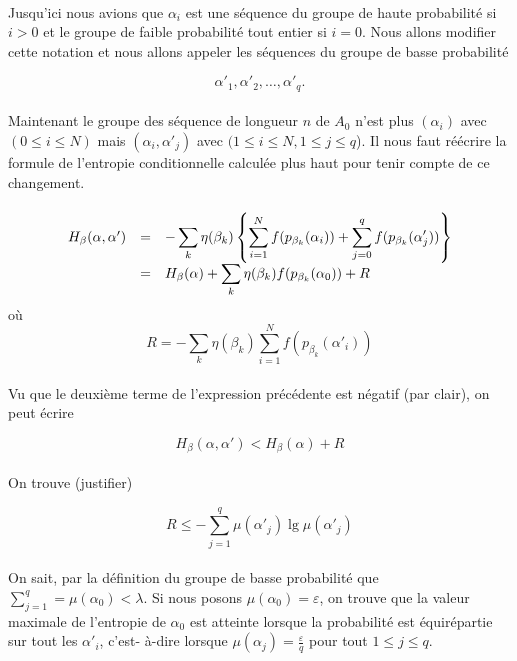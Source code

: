 	\paragraph{}
	Jusqu'ici nous avions que $\alpha_i$ est une séquence du groupe de haute probabilité si $i>0$ et le groupe de faible probabilité tout entier si $i=0$.
	Nous allons modifier cette notation et nous allons appeler les séquences du groupe de basse probabilité 
	
	\[\alpha'_1, \alpha'_2, \dots, \alpha'_q.\]
	
	\paragraph{}
	Maintenant le groupe des séquence de longueur $n$ de $A_0$ n'est plus $(\alpha_i)$ avec $(0 \le i \le N)$ mais $(\alpha_i, \alpha'_j)$ avec $(1\le i \le N, 1 \le j \le q$).
	Il nous faut réécrire la formule de l'entropie conditionnelle calculée plus haut pour tenir compte de ce changement.
	
	\paragraph{}
	\[
		\begin{array}{r c >{\displaystyle}l}
			H_\beta(\alpha,\alpha') &=& - \sum_k\eta(\beta_k)\left\{\sum_{i=1}^Nf(p_{\beta_k}(\alpha_i))+\sum_{j=0}^qf(p_{\beta_k}(\alpha'_j))\right\}\\
			&=& H_\beta(\alpha) + \sum_k\eta(\beta_k)f(p_{\beta_k}(\alpha_0))+R
		\end{array}
	\]
	où
	\[R=- \sum_k\eta(\beta_k)\sum_{i=1}^Nf(p_{\beta_k}(\alpha'_i))\]
	
	\paragraph{}
	Vu que le deuxième terme de l'expression précédente est négatif (par clair), on peut écrire
	
	\[H_\beta(\alpha,\alpha') < H_\beta(\alpha) + R\]
	
	\paragraph{}
	On trouve (justifier)
	
	\[R \le -\sum_{j=1}^q\mu(\alpha'_j)\lg\mu(\alpha'_j)\]
	
	\paragraph{}
	On sait, par la définition du groupe de basse probabilité que $\sum_{j=1}^q =\mu(\alpha_0) < \lambda$. Si nous posons $\mu(\alpha_0)=\varepsilon$,
	on trouve que la valeur maximale de l'entropie de $\alpha_0$ est atteinte lorsque la probabilité est équirépartie sur tout les $\alpha'_i$, c'est-
	à-dire lorsque $\mu(\alpha_j)=\frac{\varepsilon}{q}$ pour tout $1\le j\le q$.
	
